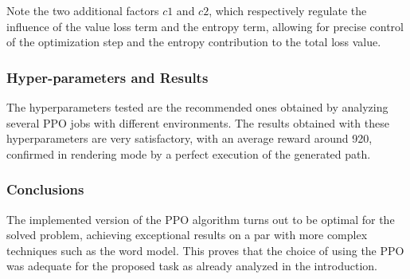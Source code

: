 \documentclass[main.tex]{subfiles}
\begin{document}
Note the two additional factors $c1$ and $c2$, which respectively regulate the influence of the value loss term and the entropy term, allowing for precise control of the optimization step and the entropy contribution to the total loss value.

\subsubsection{Hyper-parameters and Results}
\begin{table}[t]
	\centering
	\caption{PPO hyper-parameters}
	\label{tab:ppo_hyperparameters_columns}
\end{table}
The hyperparameters tested are the recommended ones obtained by analyzing several PPO jobs with different environments. The results obtained with these hyperparameters are very satisfactory, with an average reward around 920, confirmed in rendering mode by a perfect execution of the generated path.


\subsubsection{Conclusions}

The implemented version of the PPO algorithm turns out to be optimal for the solved problem, achieving exceptional results on a par with more complex techniques such as the word model. This proves that the choice of using the PPO was adequate for the proposed task as already analyzed in the introduction.
\end{document}
